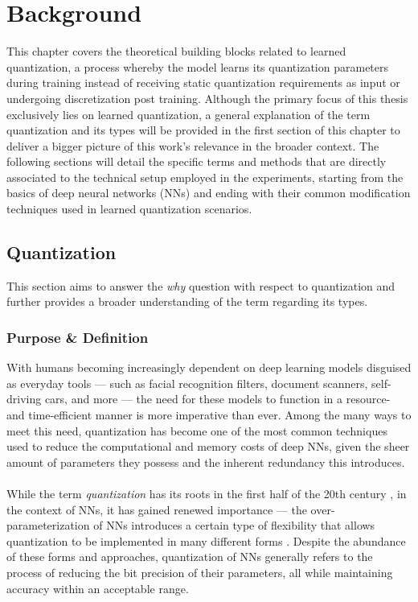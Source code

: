 \chapter{Background\label{cha:chapter2}}
This chapter covers the theoretical building blocks related to learned quantization, 
a process whereby the model learns its quantization parameters during training
instead of receiving static quantization requirements as input or undergoing discretization post training. 
Although the primary focus of this thesis exclusively lies on learned quantization, 
a general explanation of the term quantization and its types will be provided in the first section of this chapter
to deliver a bigger picture of this work's relevance in the broader context. 
The following sections will detail the specific terms and methods that are directly associated to the technical setup employed in the experiments, 
starting from the basics of deep neural networks (NNs) and ending with their common modification techniques used in learned quantization scenarios.

\section{Quantization}
\label{sec:section1}
This section aims to answer the \textit{why} question with respect to quantization and further provides a broader understanding of the term regarding its types.

\subsection{Purpose \& Definition}
\label{subsec:subsection1}
With humans becoming increasingly dependent on deep learning models disguised as everyday tools — such as facial recognition filters, 
document scanners, self-driving cars, and more — the need for these models to function in a resource- and 
time-efficient manner is more imperative than ever. Among the many ways to meet this need, 
quantization has become one of the most common techniques used to reduce the computational 
and memory costs of deep NNs, given the sheer amount of parameters they possess and the inherent redundancy this introduces.
\\
\\
While the term \textit{quantization} has its roots in the first half of the 20th century \cite{gray1998quantization}, in the context of NNs, 
it has gained renewed importance  — the over-parameterization of NNs introduces a certain type of flexibility 
that allows quantization to be implemented in many different forms \cite{gholami2021survey}.
Despite the abundance of these forms and approaches, quantization of NNs generally refers to the process of 
reducing the bit precision of their parameters, all while maintaining accuracy within an acceptable range.

